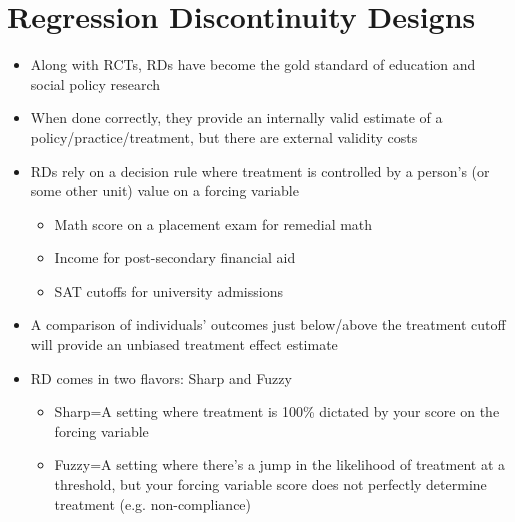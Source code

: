 \documentclass{beamer}
\begin{document}
\section{Regression Discontinuity Designs}
\frame{\sectionpage}

\begin{frame}[<+->]
	\begin{itemize}
		\item Along with RCTs, RDs have become the gold standard of education and social policy research
		\item When done correctly, they provide an internally valid estimate of a policy/practice/treatment, but there are external validity costs
		\item RDs rely on a decision rule where treatment is controlled by a person's (or some other unit) value on a forcing variable \medskip
		\begin{itemize}
			\item Math score on a placement exam for remedial math
			\item Income for post-secondary financial aid
			\item SAT cutoffs for university admissions
		\end{itemize}
			\item A comparison of individuals' outcomes just below/above the treatment cutoff will provide an unbiased treatment effect estimate
			\item RD comes in two flavors: Sharp and Fuzzy
			\begin{itemize}
				\item Sharp=A setting where treatment is 100\% dictated by your score on the forcing variable
				\item Fuzzy=A setting where there's a jump in the likelihood of treatment at a threshold, but your forcing variable score does not perfectly determine treatment (e.g. non-compliance)
			\end{itemize}
		\end{itemize}

\end{frame}
\end{document}
